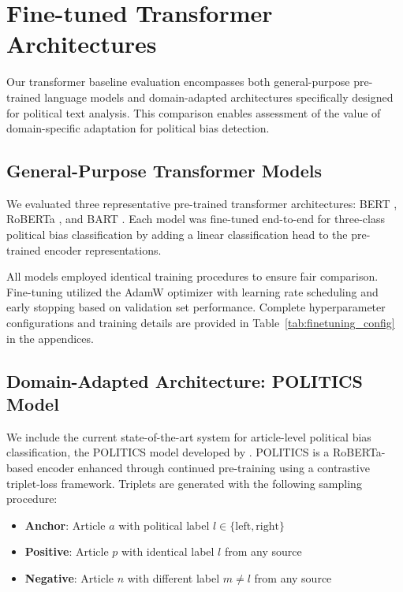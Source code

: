 \section{Fine-tuned Transformer Architectures}
\label{sec:transformer-baselines}

Our transformer baseline evaluation encompasses both general-purpose pre-trained language models and domain-adapted architectures specifically designed for political text analysis. This comparison enables assessment of the value of domain-specific adaptation for political bias detection.

\subsection{General-Purpose Transformer Models}

We evaluated three representative pre-trained transformer architectures: BERT \citep{devlin2019bert}, RoBERTa \citep{liu2019roberta}, and BART \citep{lewis2020bart}. Each model was fine-tuned end-to-end for three-class political bias classification by adding a linear classification head to the pre-trained encoder representations.

All models employed identical training procedures to ensure fair comparison. Fine-tuning utilized the AdamW optimizer with learning rate scheduling and early stopping based on validation set performance. Complete hyperparameter configurations and training details are provided in Table~\ref{tab:finetuning_config} in the appendices.

\subsection{Domain-Adapted Architecture: POLITICS Model}

We include the current state-of-the-art system for article-level political bias classification, the POLITICS model developed by \citet{liu2022politics}. POLITICS is a RoBERTa-based encoder enhanced through continued pre-training using a contrastive triplet-loss framework. Triplets are generated with the following sampling procedure:

\begin{itemize}
    \item \textbf{Anchor}: Article $a$ with political label $l \in \{\text{left}, \text{right}\}$
    \item \textbf{Positive}: Article $p$ with identical label $l$ from any source
    \item \textbf{Negative}: Article $n$ with different label $m \neq l$ from any source
\end{itemize}

